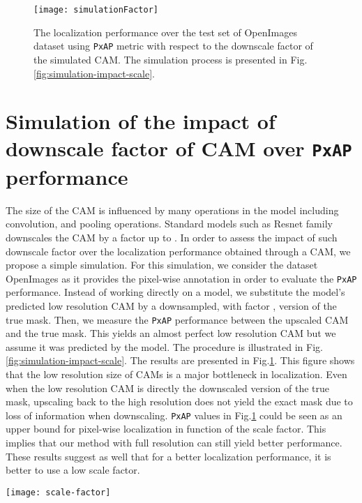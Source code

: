 \documentclass[twocolumn]{article}
\newcommand\pxap{\texttt{PxAP}\xspace}
\theoremstyle{definition}
\begin{document}
\begin{figure}[ht!]
\centering
  \centering
  \texttt{[image: simulationFactor]}
  \caption{The localization performance over the test set of OpenImages dataset using \pxap metric with respect to the downscale factor  of the simulated CAM. The simulation process is presented in Fig.\ref{fig:simulation-impact-scale}.}
  \label{fig:impact-scale}
\end{figure}




\section{Simulation of the impact of downscale factor of CAM over \pxap performance}
\label{sec:sim-impact-factor}
The size of the CAM is influenced by many operations in the model including convolution, and pooling operations. Standard models such as Resnet family~\cite{heZRS16} downscales the CAM by a factor  up to . In order to assess the impact of such downscale factor over the localization performance obtained through a CAM, we propose a simple simulation. For this simulation, we consider the dataset OpenImages as it provides the pixel-wise annotation in order to evaluate the \pxap performance. Instead of working directly on a model, we substitute the model's predicted low resolution CAM by a downsampled, with factor , version of the true mask. Then, we measure the \pxap performance between the upscaled CAM and the true mask. This yields an almost perfect low resolution CAM but we assume it was predicted by the model. The procedure is illustrated in Fig.\ref{fig:simulation-impact-scale}. The results are presented in Fig.\ref{fig:impact-scale}. This figure shows that the low resolution size of CAMs is a major bottleneck in localization. Even when the low resolution CAM is directly the downscaled version of the true mask, upscaling back to the high resolution does not yield the exact mask due to loss of information when downscaling. \pxap values in Fig.\ref{fig:impact-scale} could be seen as an upper bound for pixel-wise localization in function of the scale factor. This implies that our method with full resolution can still yield better performance. These results suggest as well that for a better localization performance, it is better to use a low scale factor.

\begin{figure*}[ht!]
\centering
  \centering
  \texttt{[image: scale-factor]}
  \caption{Simulation to evaluate the impact of CAM size over the localization performance using \pxap metric. In our simulation, we substitute the low resolution CAM predicted by the model by downscaled version of the true mask by a factor  allowing us to quickly change the scale and assess its impact on the localization performance using \pxap metric. The scaling procedure is performed using bilinear interpolation.}
  \label{fig:simulation-impact-scale}
\end{figure*}
\end{document}
